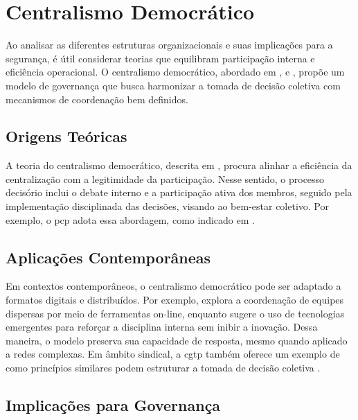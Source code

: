 \section{Centralismo Democrático}
\label{sec:centralismo_democratico}

Ao analisar as diferentes estruturas organizacionais e suas
implicações para a segurança, é útil considerar teorias que
equilibram participação interna e eficiência operacional. O
centralismo democrático, abordado em \cite{EstatutosDoPCP},
\cite{CGTPStatutes} e \cite{StillaCenturyoftheChineseModel},
propõe um modelo de governança que busca harmonizar a tomada
de decisão coletiva com mecanismos de coordenação bem
definidos.

\subsection{Origens Teóricas}
\label{sec:origens_teoricas}

A teoria do centralismo democrático, descrita em
\cite{EverydayRevolutions}, procura alinhar a eficiência da
centralização com a legitimidade da participação. Nesse
sentido, o processo decisório inclui o debate interno e a
participação ativa dos membros, seguido pela implementação
disciplinada das decisões, visando ao bem-estar coletivo.
Por exemplo, o \gls{pcp} adota essa abordagem, como indicado
em \cite{EstatutosDoPCP}.

\subsection{Aplicações Contemporâneas}
\label{sec:aplicacoes_contemporaneas}

Em contextos contemporâneos, o centralismo democrático pode
ser adaptado a formatos digitais e distribuídos. Por
exemplo, \cite{CreatingTheCollectiveSocialMedia} explora a
coordenação de equipes dispersas por meio de ferramentas
on-line, enquanto \cite{Colbac} sugere o uso de tecnologias
emergentes para reforçar a disciplina interna sem inibir a
inovação. Dessa maneira, o modelo preserva sua capacidade de
resposta, mesmo quando aplicado a redes complexas. Em âmbito
sindical, a \gls{cgtp} também oferece um exemplo de como
princípios similares podem estruturar a tomada de decisão
coletiva \cite{CGTPStatutes}.

\subsection{Implicações para Governança}
\label{sec:implicacoes_para_governanca}

